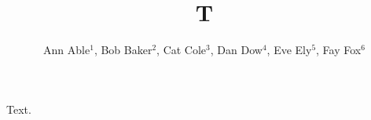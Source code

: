 \documentclass{revtex4-1}
\begin{document}
\title{T}
\author{Ann Able$^{1}$, Bob Baker$^{2}$, Cat Cole$^{3}$, Dan Dow$^{4}$, Eve Ely$^{5}$, Fay Fox$^{6}$}
\maketitle
Text.
\end{document}
